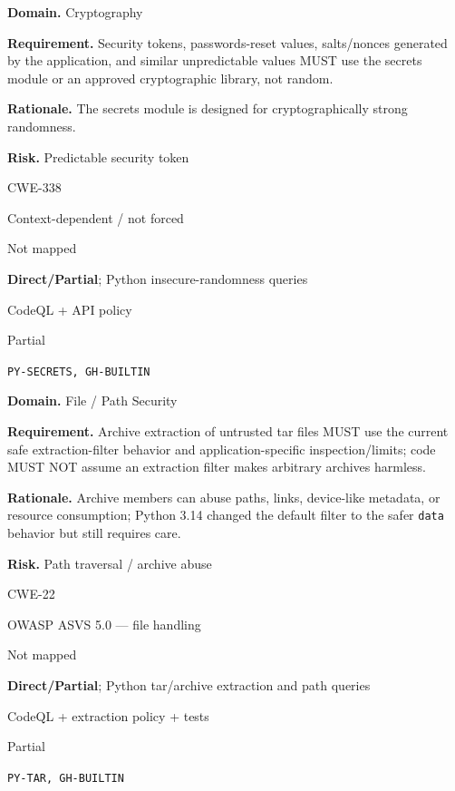 \documentclass[10pt,letterpaper]{article}
\newcommand{\code}[1]{\texttt{\small #1}}
\newcommand{\prioritybadge}[2]{\tcbox[on line,boxrule=0pt,arc=1.2mm,boxsep=0.7mm,left=1mm,right=1mm,top=0.4mm,bottom=0.4mm,colback=#2!12,coltext=#2]{\scriptsize\bfseries #1}}
\begin{document}
\begin{rulebox}[title={\texttt{SCS-PY-CRYPTO-001} \hfill \prioritybadge{Critical Control}{Critical}}]
\textbf{Domain.} Cryptography

\textbf{Requirement.} Security tokens, passwords-reset values, salts/nonces generated by the application, and similar unpredictable values MUST use the secrets module or an approved cryptographic library, not random.

\textbf{Rationale.} The secrets module is designed for cryptographically strong randomness.

\textbf{Risk.} Predictable security token

\begin{description}[leftmargin=2.65cm,labelwidth=2.3cm,style=nextline,itemsep=1pt,topsep=3pt]
  \item[CWE] CWE-338
  \item[OWASP] Context-dependent / not forced
  \item[CERT] Not mapped
  \item[CodeQL] \textbf{Direct/Partial}; Python insecure-randomness queries
  \item[Enforcement] CodeQL + API policy
  \item[Automation] Partial
  \item[Sources] \texttt{PY-SECRETS, GH-BUILTIN}
\end{description}
\end{rulebox}

\begin{rulebox}[title={\texttt{SCS-PY-FILE-001} \hfill \prioritybadge{High Priority}{High}}]
\textbf{Domain.} File / Path Security

\textbf{Requirement.} Archive extraction of untrusted tar files MUST use the current safe extraction-filter behavior and application-specific inspection/limits; code MUST NOT assume an extraction filter makes arbitrary archives harmless.

\textbf{Rationale.} Archive members can abuse paths, links, device-like metadata, or resource consumption; Python 3.14 changed the default filter to the safer \code{data} behavior but still requires care.

\textbf{Risk.} Path traversal / archive abuse

\begin{description}[leftmargin=2.65cm,labelwidth=2.3cm,style=nextline,itemsep=1pt,topsep=3pt]
  \item[CWE] CWE-22
  \item[OWASP] OWASP ASVS 5.0 --- file handling
  \item[CERT] Not mapped
  \item[CodeQL] \textbf{Direct/Partial}; Python tar/archive extraction and path queries
  \item[Enforcement] CodeQL + extraction policy + tests
  \item[Automation] Partial
  \item[Sources] \texttt{PY-TAR, GH-BUILTIN}
\end{description}
\end{rulebox}
\end{document}
